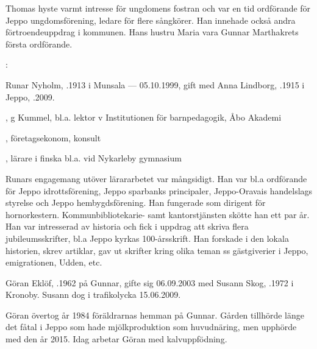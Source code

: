 Thomas hyste varmt intresse för ungdomens fostran och var en tid ordförande för Jeppo ungdomsförening, ledare för flere sångkörer. Han innehade också andra förtroendeuppdrag i kommunen. Hans hustru Maria vara Gunnar Marthakrets första ordförande.

:

Runar Nyholm, .1913 i Munsala --- 05.10.1999, gift med Anna Lindborg, .1915 i Jeppo, .2009.
\begin{jhchildren}
  \item {}, g Kummel, bl.a. lektor v Institutionen för barnpedagogik, Åbo Akademi
  \item {}, företagsekonom, konsult
  \item {}, lärare i finska bl.a. vid Nykarleby gymnasium
\end{jhchildren}

Runars engagemang utöver lärararbetet var mångsidigt. Han var bl.a ordförande för  Jeppo idrottsförening, Jeppo sparbanks principaler, Jeppo-Oravais handelslags styrelse och Jeppo hembygdsförening. Han fungerade som dirigent för hornorkestern. Kommunbibliotekarie- samt kantorstjänsten skötte han ett par år. Han var intresserad av historia och fick i uppdrag att skriva flera jubileumsskrifter, bl.a Jeppo kyrkas 100-årsskrift. Han forskade i den lokala historien, skrev artiklar, gav ut skrifter kring olika teman ss gästgiverier i Jeppo, emigrationen, Udden, etc.



%



%
Göran Eklöf, .1962 på Gunnar, gifte sig 06.09.2003 med Susann Skog, .1972 i Kronoby. Susann dog i trafikolycka 15.06.2009.
\begin{jhchildren}
  \item {}
  \item {}
\end{jhchildren}

Göran övertog år 1984  föräldrarnas hemman på Gunnar. Gården tillhörde länge det fåtal i Jeppo som hade mjölkproduktion som huvudnäring, men upphörde med den år 2015. Idag arbetar Göran med kalvuppfödning.


